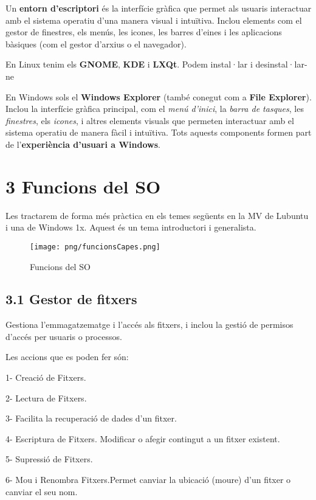 \documentclass[
  a4paper,
]{article}
\begin{document}
Un \textbf{entorn d'escriptori} és la interfície gràfica que permet als
usuaris interactuar amb el sistema operatiu d'una manera visual i
intuïtiva. Inclou elements com el gestor de finestres, els menús, les
icones, les barres d'eines i les aplicacions bàsiques (com el gestor
d'arxius o el navegador).

En Linux tenim els \textbf{GNOME}, \textbf{KDE} i \textbf{LXQt}. Podem
instal·lar i desinstal·lar-ne

En Windows sols el \textbf{Windows Explorer} (també conegut com a
\textbf{File Explorer}). Inclou la interfície gràfica principal, com el
\emph{menú d'inici}, la \emph{barra de tasques}, les \emph{finestres},
els \emph{icones}, i altres elements visuals que permeten interactuar
amb el sistema operatiu de manera fàcil i intuïtiva. Tots aquests
components formen part de l'\textbf{experiència d'usuari a Windows}.

\section{3 Funcions del SO}\label{funcions-del-so}

Les tractarem de forma més pràctica en els temes següents en la MV de
Lubuntu i una de Windows 1x. Aquest és un tema introductori i
generalista.

\begin{figure}
\centering
\texttt{[image: png/funcionsCapes.png]}
\caption{Funcions del SO}
\end{figure}

\subsection{3.1 Gestor de fitxers}\label{gestor-de-fitxers}

Gestiona l'emmagatzematge i l'accés als fitxers, i inclou la gestió de
permisos d'accés per usuaris o processos.

Les accions que es poden fer són:

1- Creació de Fitxers.

2- Lectura de Fitxers.

3- Facilita la recuperació de dades d'un fitxer.

4- Escriptura de Fitxers. Modificar o afegir contingut a un fitxer
existent.

5- Supressió de Fitxers.

6- Mou i Renombra Fitxers.Permet canviar la ubicació (moure) d'un fitxer
o canviar el seu nom.
\end{document}
